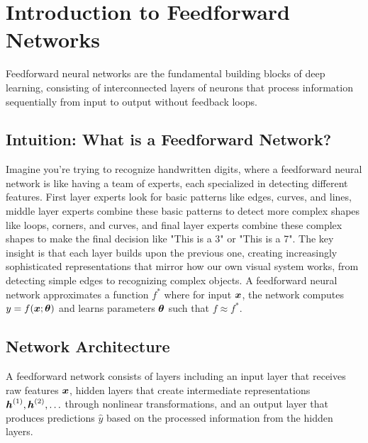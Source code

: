 
\section{Introduction to Feedforward Networks }
\label{sec:intro-feedforward}

Feedforward neural networks are the fundamental building blocks of deep learning, consisting of interconnected layers of neurons that process information sequentially from input to output without feedback loops.

\subsection{Intuition: What is a Feedforward Network?}

Imagine you're trying to recognize handwritten digits, where a feedforward neural network is like having a team of experts, each specialized in detecting different features. First layer experts look for basic patterns like edges, curves, and lines, middle layer experts combine these basic patterns to detect more complex shapes like loops, corners, and curves, and final layer experts combine these complex shapes to make the final decision like "This is a 3" or "This is a 7". The key insight is that each layer builds upon the previous one, creating increasingly sophisticated representations that mirror how our own visual system works, from detecting simple edges to recognizing complex objects. A feedforward neural network approximates a function $f^*$ where for input $\boldsymbol{x}$, the network computes $y = f(\boldsymbol{x}; \boldsymbol{\theta})$ and learns parameters $\boldsymbol{\theta}$ such that $f \approx f^*$.

\subsection{Network Architecture}

A feedforward network consists of layers including an input layer that receives raw features $\boldsymbol{x}$, hidden layers that create intermediate representations $\boldsymbol{h}^{(1)}, \boldsymbol{h}^{(2)}, \ldots$ through nonlinear transformations, and an output layer that produces predictions $\hat{y}$ based on the processed information from the hidden layers.

